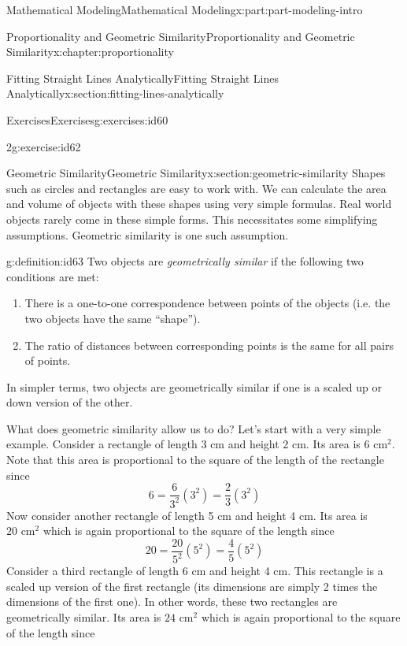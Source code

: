 \documentclass[oneside,10pt,]{book}
\numberwithin{equation}{section}
\begin{document}
\begin{partptx}{Mathematical Modeling}{}{Mathematical Modeling}{}{}{x:part:part-modeling-intro}
\begin{chapterptx}{Proportionality and Geometric Similarity}{}{Proportionality and Geometric Similarity}{}{}{x:chapter:proportionality}
\begin{sectionptx}{Fitting Straight Lines Analytically}{}{Fitting Straight Lines Analytically}{}{}{x:section:fitting-lines-analytically}
\begin{exercises-subsection-numberless}{Exercises}{}{Exercises}{}{}{g:exercises:id60}
\begin{divisionexercise}{2}{}{}{g:exercise:id62}
\begin{enumerate}[font=\bfseries,label=(\alph*),ref=\alph*]
\end{enumerate}
\end{divisionexercise}%
\end{exercises-subsection-numberless}
\end{sectionptx}
%
%
\typeout{************************************************}
\typeout{************************************************}
%
\begin{sectionptx}{Geometric Similarity}{}{Geometric Similarity}{}{}{x:section:geometric-similarity}
Shapes such as circles and rectangles are easy to work with. We can calculate the area and volume of objects with these shapes using very simple formulas. Real world objects rarely come in these simple forms. This necessitates some simplifying assumptions. Geometric similarity is one such assumption.%
\begin{definition}{}{g:definition:id63}%
Two objects are \emph{geometrically similar} if the following two conditions are met:%
%
\begin{enumerate}
\item{}There is a one-to-one correspondence between points of the objects (i.e. the two objects have the same ``shape'').%
\item{}The ratio of distances between corresponding points is the same for all pairs of points.%
\end{enumerate}
\end{definition}
In simpler terms, two objects are geometrically similar if one is a scaled up or down version of the other.%
\par
What does geometric similarity allow us to do? Let’s start with a very simple example. Consider a rectangle of length 3 cm and height 2 cm. Its area is \(6 \text{ cm}^2\). Note that this area is proportional to the square of the length of the rectangle since%
%
\begin{equation*}
6 = \frac6{3^2} (3^2) = \frac23(3^2)
\end{equation*}
Now consider another rectangle of length 5 cm and height 4 cm. Its area is \(20 \text{ cm}^2\) which is again proportional to the square of the length since%
%
\begin{equation*}
20 = \frac{20}{5^2} (5^2) = \frac45(5^2)
\end{equation*}
Consider a third rectangle of length 6 cm and height 4 cm. This rectangle is a scaled up version of the first rectangle (its dimensions are simply 2 times the dimensions of the first one). In other words, these two rectangles are geometrically similar. Its area is \(24 \text{ cm}^2\) which is again proportional to the square of the length since%

\end{sectionptx}
\end{chapterptx}
\end{partptx}
\end{document}
